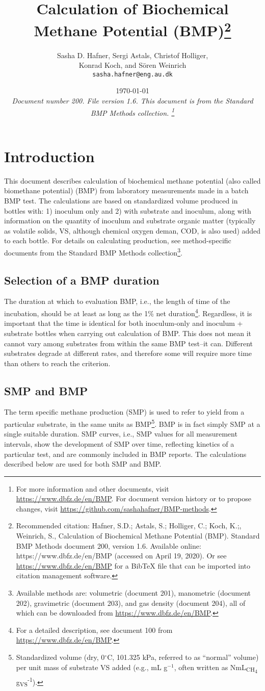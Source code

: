 \documentclass[]{article}
\title {Calculation of Biochemical Methane Potential (BMP)\footnote{
  Recommended citation: 
Hafner, S.D.; Astals, S.; Holliger, C.; Koch, K.;, Weinrich, S., Calculation of Biochemical Methane Potential (BMP). Standard BMP Methods document 200, version 1.6. Available online: https://www.dbfz.de/en/BMP (accessed on April 19, 2020).
\newline
  Or see \url{https://www.dbfz.de/en/BMP} for a BibTeX file that can be imported into citation management software.
}}
\author{Sasha D. Hafner, Sergi Astals, Christof Holliger, \\ Konrad Koch, and S{\"o}ren Weinrich\\
\texttt{sasha.hafner@eng.au.dk}
}
\date{\today \\
\bigskip
\textit{
  Document number 200.
  File version 1.6. 
  This document is from the Standard BMP Methods collection.
    \footnote{For more information and other documents, visit \url{https://www.dbfz.de/en/BMP}. 
    For document version history or to propose changes, visit \url{https://github.com/sashahafner/BMP-methods}.}
}
}
\begin{document}
\maketitle

\section{Introduction}
This document describes calculation of biochemical methane potential (also called biomethane potential) (BMP) from laboratory measurements made in a batch BMP test.
The calculations are based on standardized  volume produced in bottles with: 1) inoculum only and 2) with substrate and inoculum, along with information on the quantity of inoculum and substrate organic matter (typically as volatile solids, VS, although chemical oxygen deman, COD, is also used) added to each bottle.
For details on calculating  production, see method-specific documents from the Standard BMP Methods collection\footnote{
  Available methods are: volumetric (document 201), manometric (document 202), gravimetric (document 203), and gas density (document 204), all of which can be downloaded from \url{https://www.dbfz.de/en/BMP}.
}.

\subsection{Selection of a BMP duration}
The duration at which to evaluation BMP, i.e., the length of time of the incubation, should be at least as long as the 1\% net duration\footnote{
  For a detailed description, see document 100 from \url{https://www.dbfz.de/en/BMP}.
}.
Regardless, it is important that the time is identical for both inoculum-only and inoculum + substrate bottles when carrying out calculation of BMP.
This does not mean it cannot vary among substrates from within the same BMP test--it can.
Different substrates degrade at different rates, and therefore some will require more time than others to reach the criterion.

\subsection{SMP and BMP}
The term specific methane production (SMP) is used to refer to  yield from a particular substrate, in the same units as BMP\footnote{
  Standardized  volume (dry, 0$^\circ$C, 101.325 kPa, referred to as ``normal'' volume) per unit mass of substrate VS added (e.g., mL g$^{-1}$, often written as NmL\textsubscript{CH\textsubscript{4}} g\textsubscript{VS}\textsuperscript{-1}).
}.
BMP is in fact simply SMP at a single suitable duration.
SMP curves, i.e., SMP values for all measurement intervals, show the development of SMP over time, reflecting kinetics of a particular test, and are commonly included in BMP reports.
The calculations described below are used for both SMP and BMP.
\end{document}
